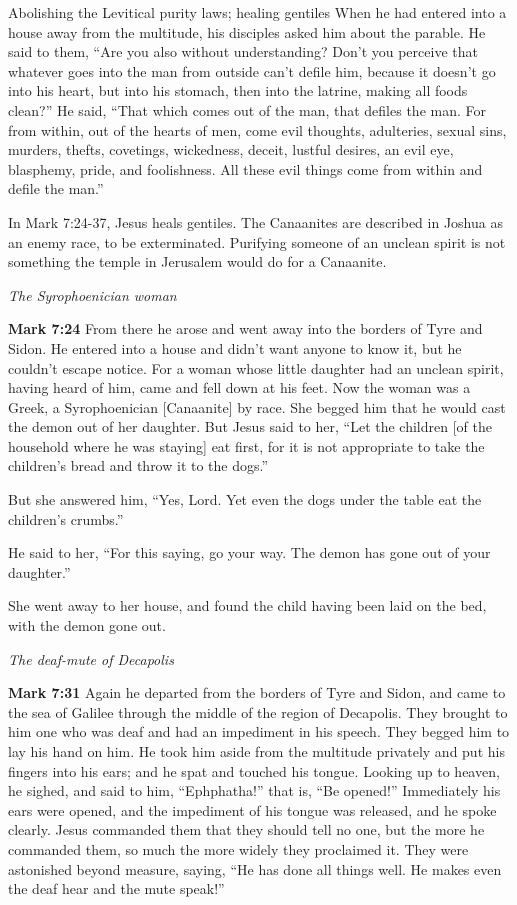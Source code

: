 \documentclass[10pt,twoside]{article} %
\newcommand{\quotesize}{\normalsize{}}
\newcommand{\comm}[1]{\begingroup \color{black!50} #1\endgroup}
\newenvironment{quotetext}{\begingroup\quotesize}{\endgroup}
\newcommand{\bible}[2]{\begin{quotetext}\textbf{#1} #2\end{quotetext}}
\newcommand{\gospelmark}[2]{\bible{Mark #1}{#2}}
\newcommand{\subhead}[1]{\emph{#1}\par}
\begin{document}
\begin{section}{Abolishing the Levitical purity laws; healing gentiles}
{  When he had entered into a house away from the multitude, his disciples asked him about the parable.   He said to them, ``Are you also without understanding? Don't you perceive that whatever goes into the man from outside can't defile him,    because it doesn't go into his heart, but into his stomach, then into the latrine, making all foods clean?''   He said, ``That which comes out of the man, that defiles the man.    For from within, out of the hearts of men, come evil thoughts, adulteries, sexual sins, murders, thefts,    covetings, wickedness, deceit, lustful desires, an evil eye, blasphemy, pride, and foolishness.    All these evil things come from within and defile the man.''
}

\comm{
In Mark 7:24-37, Jesus heals gentiles. The Canaanites are described in Joshua as an enemy race, to be exterminated. Purifying someone
of an unclean spirit is not something the temple in Jerusalem would do for a Canaanite.
}

\subhead{The Syrophoenician woman}

\gospelmark{7:24}{
  From there he arose and went away into the borders of Tyre and Sidon. He entered into a house and didn't want anyone to know it, but he couldn't escape notice.   For a woman whose little daughter had an unclean spirit, having heard of him, came and fell down at his feet.   Now the woman was a Greek, a Syrophoenician [Canaanite] by race. She begged him that he would cast the demon out of her daughter.   But Jesus said to her, ``Let the children
[of the household where he was staying] eat first, for it is not appropriate to take the children's bread and throw it to the dogs.''


  But she answered him, ``Yes, Lord. Yet even the dogs under the table eat the children's crumbs.''

  He said to her, ``For this saying, go your way. The demon has gone out of your daughter.''

  She went away to her house, and found the child having been laid on the bed, with the demon gone out.
}

\subhead{The deaf-mute of Decapolis}

\gospelmark{7:31}{
  Again he departed from the borders of Tyre and Sidon, and came to the sea of Galilee through the middle of the region of Decapolis.   They brought to him one who was deaf and had an impediment in his speech. They begged him to lay his hand on him.   He took him aside from the multitude privately and put his fingers into his ears; and he spat and touched his tongue.   Looking up to heaven, he sighed, and said to him, ``Ephphatha!'' that is, ``Be opened!''   Immediately his ears were opened, and the impediment of his tongue was released, and he spoke clearly.   Jesus commanded them that they should tell no one, but the more he commanded them, so much the more widely they proclaimed it.   They were astonished beyond measure, saying, ``He has done all things well. He makes even the deaf hear and the mute speak!''
}


\end{section}
\end{document}
